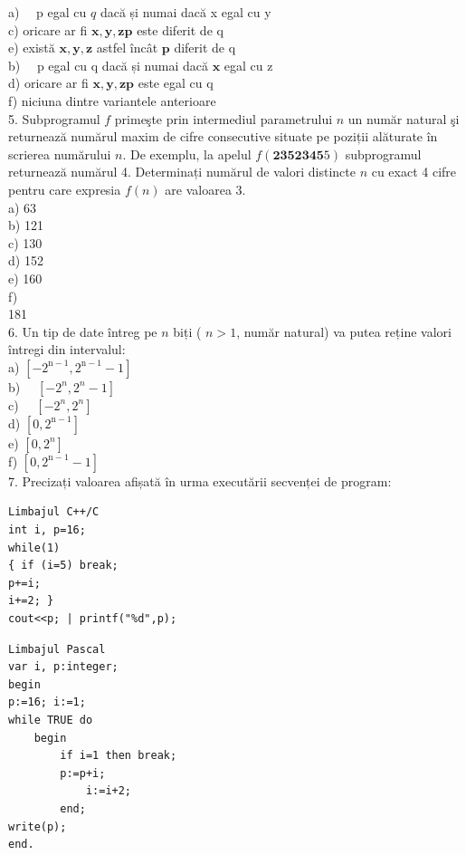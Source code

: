 \documentclass[10pt]{article}
\begin{document}
a) $\quad \mathrm{p}$ egal cu $q$ dacă și numai dacă x egal cu y\\
c) oricare ar fi $\mathbf{x}, \mathbf{y}, \mathbf{z} \mathbf{p}$ este diferit de q\\
e) există $\mathbf{x}, \mathbf{y}, \mathbf{z}$ astfel încât $\mathbf{p}$ diferit de q\\
b) $\quad \mathrm{p}$ egal cu q dacă și numai dacă $\mathbf{x}$ egal cu z\\
d) oricare ar fi $\mathbf{x}, \mathbf{y}, \mathbf{z} \mathbf{p}$ este egal cu q\\
f) niciuna dintre variantele anterioare\\
5. Subprogramul $f$ primeşte prin intermediul parametrului $n$ un număr natural şi returnează numărul maxim de cifre consecutive situate pe poziții alăturate în scrierea numărului $n$. De exemplu, la apelul $f(\mathbf{2 3 5 2 3 4 5} 5)$ subprogramul returnează numărul 4. Determinați numărul de valori distincte $n$ cu exact 4 cifre pentru care expresia $f(n)$ are valoarea 3.\\
a) 63\\
b) 121\\
c) 130\\
d) 152\\
e) 160\\
f)\\
181\\
6. Un tip de date întreg pe $n$ biți ( $n>1$, număr natural) va putea reține valori întregi din intervalul:\\
a) $\left[-2^{\mathrm{n}-1}, 2^{\mathrm{n}-1}-1\right]$\\
b) $\quad\left[-2^{n}, 2^{n}-1\right]$\\
c) $\quad\left[-2^{n}, 2^{n}\right]$\\
d) $\left[0,2^{\mathrm{n}-1}\right]$\\
e) $\left[0,2^{n}\right]$\\
f) $\left[0,2^{\mathrm{n}-1}-1\right]$\\
7. Precizați valoarea afișată în urma executării secvenței de program:

\begin{verbatim}
Limbajul C++/C
int i, p=16;
while(1)
{ if (i=5) break;
p+=i;
i+=2; }
cout<<p; | printf("%d",p);
\end{verbatim}

\begin{verbatim}
Limbajul Pascal
var i, p:integer;
begin
p:=16; i:=1;
while TRUE do
    begin
        if i=1 then break;
        p:=p+i;
            i:=i+2;
        end;
write(p);
end.
\end{verbatim}
\end{document}
